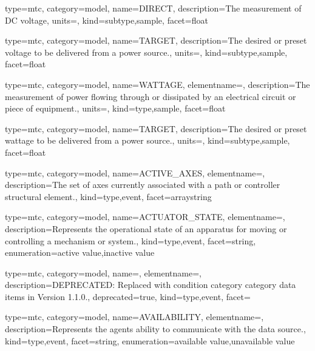 {
  type=mtc,
  category=model,
  name={DIRECT},
  description={The measurement of DC voltage},
  units=,
  kind={subtype,sample},
  facet={\gls{float}}
}


{
  type=mtc,
  category=model,
  name={TARGET},
  description={The desired or preset voltage to be delivered from a power source.},
  units=,
  kind={subtype,sample},
  facet={\gls{float}}
}


{
  type=mtc,
  category=model,
  name={WATTAGE},
  elementname=,
  description={The measurement of power flowing through or dissipated by an electrical circuit or piece of equipment.},
  units=,
  kind={type,sample},
  facet={\gls{float}}
}


{
  type=mtc,
  category=model,
  name={TARGET},
  description={The desired or preset wattage to be delivered from a power source.},
  units=,
  kind={subtype,sample},
  facet={\gls{float}}
}


{
  type=mtc,
  category=model,
  name={ACTIVE\_AXES},
  elementname=,
  description={The set of axes currently associated with a \gls{path} or \gls{controller} \gls{structural element}.},
  kind={type,event},
  facet={\gls{arraystring}}
}


{
  type=mtc,
  category=model,
  name={ACTUATOR\_STATE},
  elementname=,
  description={Represents the operational state of an apparatus for moving or controlling a mechanism or system.},
  kind={type,event},
  facet={\gls{string}},
  enumeration={\gls{active value},\gls{inactive value}}
}


{
  type=mtc,
  category=model,
  name=,
  elementname=,
  description={DEPRECATED: Replaced with \gls{condition category} category data items in Version 1.1.0.},
  deprecated={true},
  kind={type,event},
  facet={}
}


{
  type=mtc,
  category=model,
  name={AVAILABILITY},
  elementname=,
  description={Represents the \gls{agent}s ability to communicate with the data source.},
  kind={type,event},
  facet={\gls{string}},
  enumeration={\gls{available value},\gls{unavailable value}}
}


